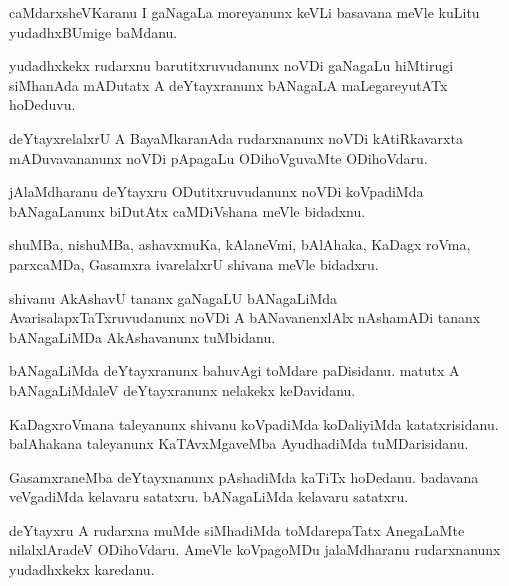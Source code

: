 \documentclass{article}
\begin{document}
\begin{mn}%
caMdarxsheVKaranu I gaNagaLa moreyanunx keVLi basavana meVle kuLitu yudadhxBUmige baMdanu.
\end{mn}

\begin{mn}%
yudadhxkekx rudarxnu barutitxruvudanunx noVDi gaNagaLu hiMtirugi siMhanAda mADutatx A deYtayxranunx 
bANagaLA maLegareyutATx hoDeduvu.
\end{mn}

\begin{mn}%
deYtayxrelalxrU A BayaMkaranAda rudarxnanunx noVDi kAtiRkavarxta mADuvavananunx noVDi pApagaLu 
ODihoVguvaMte ODihoVdaru.
\end{mn}

\begin{mn}%
jAlaMdharanu deYtayxru ODutitxruvudanunx noVDi koVpadiMda bANagaLanunx biDutAtx caMDiVshana meVle 
bidadxnu.
\end{mn}

\begin{mn}%
shuMBa, nishuMBa, ashavxmuKa, kAlaneVmi, bAlAhaka, KaDagx roVma, parxcaMDa, Gasamxra ivarelalxrU 
shivana meVle bidadxru.
\end{mn}

\begin{mn}%
shivanu AkAshavU tananx gaNagaLU bANagaLiMda AvarisalapxTaTxruvudanunx noVDi A bANavanenxlAlx 
nAshamADi tananx bANagaLiMDa AkAshavanunx tuMbidanu.
\end{mn}

\begin{mn}%
bANagaLiMda deYtayxranunx bahuvAgi toMdare paDisidanu. matutx A bANagaLiMdaleV deYtayxranunx 
nelakekx keDavidanu.
\end{mn}

\begin{mn}%
KaDagxroVmana taleyanunx shivanu koVpadiMda koDaliyiMda katatxrisidanu. balAhakana taleyanunx 
KaTAvxMgaveMba AyudhadiMda tuMDarisidanu.
\end{mn}

\begin{mn}%
GasamxraneMba deYtayxnanunx pAshadiMda kaTiTx hoDedanu. badavana veVgadiMda kelavaru satatxru. 
bANagaLiMda kelavaru satatxru.
\end{mn}

\begin{mn}%
deYtayxru A rudarxna muMde siMhadiMda toMdarepaTatx AnegaLaMte nilalxlAradeV ODihoVdaru. AmeVle 
koVpagoMDu jalaMdharanu rudarxnanunx yudadhxkekx karedanu.
\end{mn}
\end{document}
